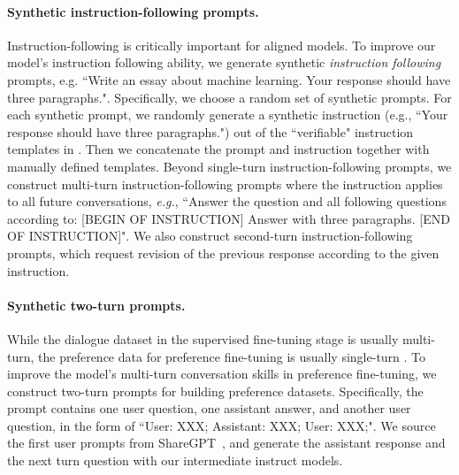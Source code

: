 \documentclass[11pt]{article}
\begin{document}
\paragraph{Synthetic instruction-following prompts.} Instruction-following is critically important for aligned models. To improve our model's instruction following ability, we generate synthetic \textit{instruction following} prompts, e.g. ``Write an essay about machine learning. Your response should have three paragraphs.". Specifically, we choose a random set of synthetic prompts. For each synthetic prompt, we randomly generate a synthetic instruction (e.g., ``Your response should have three paragraphs.") out of the ``verifiable" instruction templates in \citet{zhou2023instruction}. Then we concatenate the prompt and instruction together with manually defined templates. Beyond single-turn instruction-following prompts, we construct multi-turn instruction-following prompts where the instruction applies to all future conversations, \textit{e.g.}, ``Answer the question and all following questions according to: [BEGIN OF INSTRUCTION] Answer with three paragraphs. [END OF INSTRUCTION]". We also construct second-turn instruction-following prompts, which request revision of the previous response according to the given instruction.
 
\paragraph{Synthetic two-turn prompts.} While the dialogue dataset in the supervised fine-tuning stage is usually multi-turn, the preference data for preference fine-tuning is usually single-turn \citep{bai2022training, cui2023ultrafeedback}. To improve the model's multi-turn conversation skills in preference fine-tuning, we construct two-turn prompts for building preference datasets. Specifically, the prompt contains one user question, one assistant answer, and another user question, in the form of ``User: XXX; Assistant: XXX; User: XXX;". We source the first user prompts from ShareGPT~\citep{sharegpt2023}, and generate the assistant response and the next turn question with our intermediate instruct models.
\end{document}
